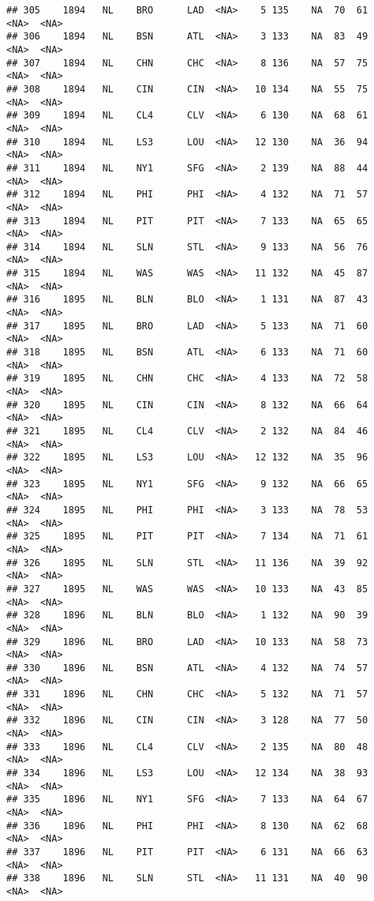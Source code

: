 \documentclass[]{article}
\begin{document}
\begin{verbatim}
## 305    1894   NL    BRO      LAD  <NA>    5 135    NA  70  61   <NA>  <NA>
## 306    1894   NL    BSN      ATL  <NA>    3 133    NA  83  49   <NA>  <NA>
## 307    1894   NL    CHN      CHC  <NA>    8 136    NA  57  75   <NA>  <NA>
## 308    1894   NL    CIN      CIN  <NA>   10 134    NA  55  75   <NA>  <NA>
## 309    1894   NL    CL4      CLV  <NA>    6 130    NA  68  61   <NA>  <NA>
## 310    1894   NL    LS3      LOU  <NA>   12 130    NA  36  94   <NA>  <NA>
## 311    1894   NL    NY1      SFG  <NA>    2 139    NA  88  44   <NA>  <NA>
## 312    1894   NL    PHI      PHI  <NA>    4 132    NA  71  57   <NA>  <NA>
## 313    1894   NL    PIT      PIT  <NA>    7 133    NA  65  65   <NA>  <NA>
## 314    1894   NL    SLN      STL  <NA>    9 133    NA  56  76   <NA>  <NA>
## 315    1894   NL    WAS      WAS  <NA>   11 132    NA  45  87   <NA>  <NA>
## 316    1895   NL    BLN      BLO  <NA>    1 131    NA  87  43   <NA>  <NA>
## 317    1895   NL    BRO      LAD  <NA>    5 133    NA  71  60   <NA>  <NA>
## 318    1895   NL    BSN      ATL  <NA>    6 133    NA  71  60   <NA>  <NA>
## 319    1895   NL    CHN      CHC  <NA>    4 133    NA  72  58   <NA>  <NA>
## 320    1895   NL    CIN      CIN  <NA>    8 132    NA  66  64   <NA>  <NA>
## 321    1895   NL    CL4      CLV  <NA>    2 132    NA  84  46   <NA>  <NA>
## 322    1895   NL    LS3      LOU  <NA>   12 132    NA  35  96   <NA>  <NA>
## 323    1895   NL    NY1      SFG  <NA>    9 132    NA  66  65   <NA>  <NA>
## 324    1895   NL    PHI      PHI  <NA>    3 133    NA  78  53   <NA>  <NA>
## 325    1895   NL    PIT      PIT  <NA>    7 134    NA  71  61   <NA>  <NA>
## 326    1895   NL    SLN      STL  <NA>   11 136    NA  39  92   <NA>  <NA>
## 327    1895   NL    WAS      WAS  <NA>   10 133    NA  43  85   <NA>  <NA>
## 328    1896   NL    BLN      BLO  <NA>    1 132    NA  90  39   <NA>  <NA>
## 329    1896   NL    BRO      LAD  <NA>   10 133    NA  58  73   <NA>  <NA>
## 330    1896   NL    BSN      ATL  <NA>    4 132    NA  74  57   <NA>  <NA>
## 331    1896   NL    CHN      CHC  <NA>    5 132    NA  71  57   <NA>  <NA>
## 332    1896   NL    CIN      CIN  <NA>    3 128    NA  77  50   <NA>  <NA>
## 333    1896   NL    CL4      CLV  <NA>    2 135    NA  80  48   <NA>  <NA>
## 334    1896   NL    LS3      LOU  <NA>   12 134    NA  38  93   <NA>  <NA>
## 335    1896   NL    NY1      SFG  <NA>    7 133    NA  64  67   <NA>  <NA>
## 336    1896   NL    PHI      PHI  <NA>    8 130    NA  62  68   <NA>  <NA>
## 337    1896   NL    PIT      PIT  <NA>    6 131    NA  66  63   <NA>  <NA>
## 338    1896   NL    SLN      STL  <NA>   11 131    NA  40  90   <NA>  <NA>

\end{verbatim}
\end{document}
